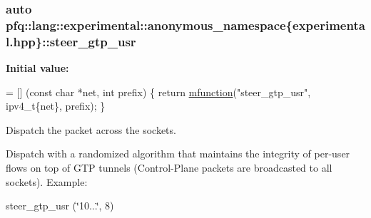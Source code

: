 \hypertarget{namespacepfq_1_1lang_1_1experimental_1_1anonymous__namespace_02experimental_8hpp_03_a6b08a2b49251677736f1939eaadac4a6}{
\subsubsection[{steer\+\_\+gtp\+\_\+usr}]{\setlength{\rightskip}{0pt plus 5cm}auto pfq\+::lang\+::experimental\+::anonymous\+\_\+namespace\{experimental.\+hpp\}\+::steer\+\_\+gtp\+\_\+usr}}\label{namespacepfq_1_1lang_1_1experimental_1_1anonymous__namespace_02experimental_8hpp_03_a6b08a2b49251677736f1939eaadac4a6}
{\bfseries Initial value\+:}
\begin{DoxyCode}
= [] (\textcolor{keyword}{const} \textcolor{keywordtype}{char} *net, \textcolor{keywordtype}{int} prefix)
        \{
            \textcolor{keywordflow}{return} \hyperlink{namespacepfq_1_1lang_a1aacba4a159b6c2ddf275bd1fec19ec2}{mfunction}(\textcolor{stringliteral}{"steer\_gtp\_usr"}, ipv4\_t\{net\}, prefix);
        \}
\end{DoxyCode}


Dispatch the packet across the sockets. 

Dispatch with a randomized algorithm that maintains the integrity of per-\/user flows on top of G\+T\+P tunnels (Control-\/\+Plane packets are broadcasted to all sockets). Example\+:

steer\+\_\+gtp\+\_\+usr (\char`\"{}10...\char`\"{}, 8) 